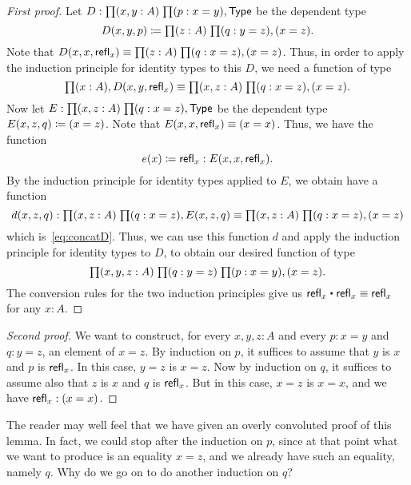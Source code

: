 \begin{proof}[First proof]
  Let $D:\prd{x,y:A}{p:x=y} \type$ be the dependent type
  \begin{equation*}
    D(x,y,p)\defeq \prd{z:A}{q:y=z} (x=z).
  \end{equation*}
  Note that $D(x,x,\refl x) \jdeq \prd{z:A}{q:x=z} (x=z)$.
  Thus, in order to apply the induction principle for identity types to this $D$, we need a function of type
  \begin{equation}\label{eq:concatD}
    \prd{x:A} D(x,y,\refl{x})
    \jdeq \prd{x,z:A}{q:x=z} (x=z).
  \end{equation}
  Now let $E:\prd{x,z:A}{q:x=z}\type$ be the dependent type $E(x,z,q)\coloneqq (x=z)$.
  Note that $E(x,x,\mathsf{refl}_{x}) \equiv (x=x)$.
  Thus, we have the function
  \begin{equation*}
    e(x) \coloneqq \mathsf{refl}_{x} : E(x,x,\mathsf{refl}_{x}).
  \end{equation*}
  By the induction principle for identity types applied to $E$, we obtain have a function
  \begin{equation*}
    d(x,z,q) : \prd{x,z:A}{q:x=z} E(x,z,q) \jdeq \prd{x,z:A}{q:x=z} (x=z)
  \end{equation*}
  which is~\eqref{eq:concatD}.
  Thus, we can use this function $d$ and apply the induction principle for identity types to $D$, to obtain our desired function of type
  \begin{equation*}
    \prd{x,y,z:A}{q:y=z}{p:x=y} (x=z).
  \end{equation*}
  The conversion rules for the two induction principles give us $\refl{x}\ct \refl{x}\jdeq \refl{x}$ for any $x:A$.
\end{proof}

\begin{proof}[Second proof]
  We want to construct, for every $x,y,z:A$ and every $p:x=y$ and $q:y=z$, an element of $x=z$.
  By induction on $p$, it suffices to assume that $y$ is $x$ and $p$ is $\mathsf{refl}_{x}$.
  In this case, $y=z$ is $x=z$.
  Now by induction on $q$, it suffices to assume also that $z$ is $x$ and $q$ is $\mathsf{refl}_{x}$.
  But in this case, $x=z$ is $x=x$, and we have $\mathsf{refl}_{x}:(x=x)$.
\end{proof}

The reader may well feel that we have given an overly convoluted proof of this lemma.
In fact, we could stop after the induction on $p$, since at that point what we want to produce is an equality $x=z$, and we already have such an equality, namely $q$.
Why do we go on to do another induction on $q$?

